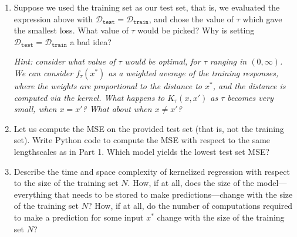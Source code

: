 \documentclass[submit]{harvardml}
\begin{document}
\begin{problem}
\begin{enumerate}
\item Suppose we used the training set as our test set, that is, we evaluated the expression above with $\mathcal{D}_\texttt{test} = \mathcal{D}_\texttt{train}$, and chose the value of $\tau$ which gave the smallest loss.  What value of $\tau$ would be picked?  Why is setting $\mathcal{D}_\texttt{test} = \mathcal{D}_\texttt{train}$ a bad idea?
   
\emph{Hint: consider what value of $\tau$ would be optimal, for $\tau$ ranging in $(0, \infty)$. We can consider $f_\tau(x^*)$ as a weighted average of the training responses, where the weights are proportional to the distance to $x^*$, and the distance is computed via the kernel. What happens to $K_\tau(x, x')$ as $\tau$ becomes very small, when $x = x'$? What about when $x \neq x'$?}

\item Let us compute the MSE on the provided test set (that is, not the training set). Write Python code to compute the MSE with respect to the same lengthscales as in Part 1. Which model yields the lowest test set MSE? 

\item Describe the time and space complexity of kernelized regression with respect to the size of the training set $N$.  How, if at all, does the size of the model---everything that needs to be stored to make predictions---change with the size of the training set $N$?  How, if at all, do the number of computations required to make a prediction for some input $x^*$ change with the size of the training set $N$?

\end{enumerate}

\end{problem}
\end{document}
